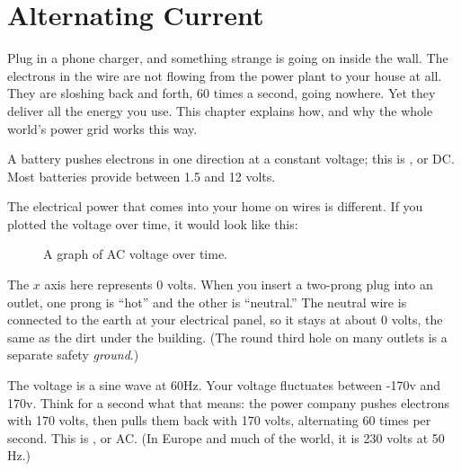 \chapter{Alternating Current}
Plug in a phone charger, and something strange is going on inside the
wall. The electrons in the wire are not flowing from the power plant to
your house at all. They are sloshing back and forth, 60 times a second,
going nowhere. Yet they deliver all the energy you use. This chapter
explains how, and why the whole world's power grid works this way.

A battery pushes electrons in one direction at a constant voltage; this is
, or DC. Most batteries
provide between 1.5 and 12 volts.

The electrical power that comes into your home on wires is
different. If you plotted the voltage over time, it would look like
this:
\begin{figure}[H]
    \centering
    \caption{A graph of AC voltage over time.}
    \label{fig:acvoltsGraph}
\end{figure}

The $x$ axis here represents 0 volts. When you insert a two-prong plug
into an outlet, one prong is ``hot'' and the other is ``neutral.'' The
neutral wire is connected to the earth at your electrical panel, so it
stays at about 0 volts, the same as the dirt under the building. (The
round third hole on many outlets is a separate safety \emph{ground}.)

The voltage is a sine wave at 60Hz. Your voltage fluctuates between
-170v and 170v. Think for a second what that means: the power company pushes electrons
with 170 volts, then pulls them back with 170 volts, alternating 60 times
per second. This is , or AC. (In Europe and
much of the world, it is 230 volts at 50 Hz.)

